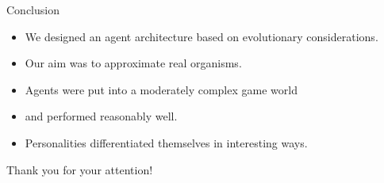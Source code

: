             \begin{frame}{Conclusion}
               \begin{itemize}
                  \item We designed an agent architecture based on evolutionary considerations.
                  \pause
                  \item Our aim was to approximate real organisms.
                  \pause
                  \item Agents were put into a moderately complex game world
                  \pause
                  \item and performed reasonably well.
                  \pause
                  \item Personalities differentiated themselves in interesting ways.
               \end{itemize}
            \end{frame}
            
            \begin{frame}[plain, c]
               \begin{center}
                  \huge Thank you for your attention!
               \end{center}
            \end{frame}